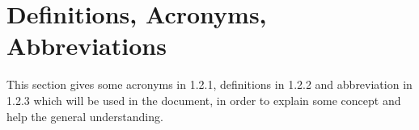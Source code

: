 \section{Definitions, Acronyms, Abbreviations}

This section gives some acronyms in 1.2.1, definitions in 1.2.2 and abbreviation in 1.2.3 which will be used in the document, in order to explain some concept and help the general understanding.



